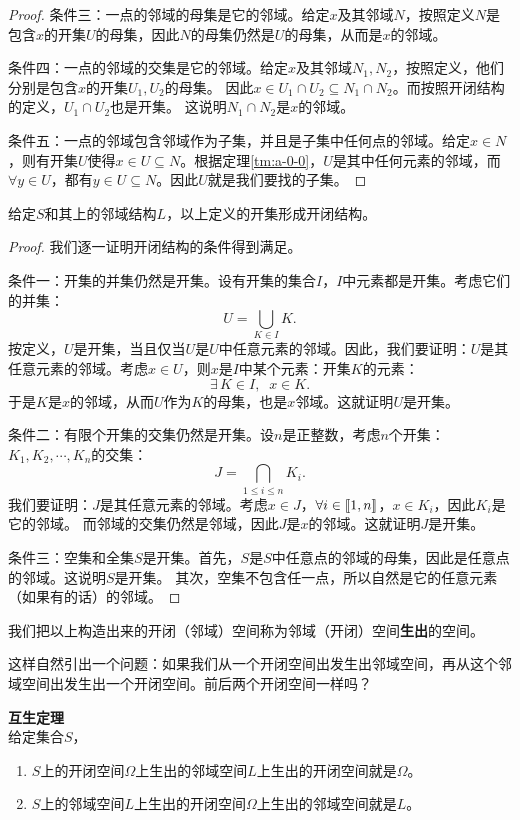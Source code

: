 \documentclass[12pt,UTF8]{ctexbook}
\begin{document}
\begin{appendix}
\begin{proof}
    条件三：一点的邻域的母集是它的邻域。给定$x$及其邻域$N$，按照定义$N$是包含$x$的开集$U$的母集，因此$N$的母集仍然是$U$的母集，从而是$x$的邻域。

    条件四：一点的邻域的交集是它的邻域。给定$x$及其邻域$N_1, N_2$，按照定义，他们分别是包含$x$的开集$U_1, U_2$的母集。
    因此$x\in U_1\cap U_2 \subseteq N_1\cap N_2 $。而按照开闭结构的定义，$U_1\cap  U_2$也是开集。
    这说明$N_1\cap N_2$是$x$的邻域。

    条件五：一点的邻域包含邻域作为子集，并且是子集中任何点的邻域。给定$x\in N$，则有开集$U$使得$x\in U \subseteq N$。根据定理\ref{tm:a-0-0}，$U$是其中任何元素的邻域，而$\forall y \in U$，都有$y\in U \subseteq N$。因此$U$就是我们要找的子集。
\end{proof}

\begin{tm}
    给定$S$和其上的邻域结构$L$，以上定义的开集形成开闭结构。
\end{tm}

\begin{proof}
    我们逐一证明开闭结构的条件得到满足。

    条件一：开集的并集仍然是开集。设有开集的集合$I$，$I$中元素都是开集。考虑它们的并集：
    $$ U = \bigcup_{K\in I} K. $$
    按定义，$U$是开集，当且仅当$U$是$U$中任意元素的邻域。因此，我们要证明：$U$是其任意元素的邻域。考虑$x\in U$，则$x$是$I$中某个元素：开集$K$的元素：
    $$ \exists \, K \in I, \;\; x \in K.$$
    于是$K$是$x$的邻域，从而$U$作为$K$的母集，也是$x$邻域。这就证明$U$是开集。

    条件二：有限个开集的交集仍然是开集。设$n$是正整数，考虑$n$个开集：$K_1, K_2, \cdots, K_n$的交集：
    $$ J = \bigcap_{1\leqslant i \leqslant n} K_i.$$
    我们要证明：$J$是其任意元素的邻域。考虑$x\in J$，$\forall i\in[\![1,n]\!]$，$x\in K_i$，因此$K_i$是它的邻域。
    而邻域的交集仍然是邻域，因此$J$是$x$的邻域。这就证明$J$是开集。

    条件三：空集和全集$S$是开集。首先，$S$是$S$中任意点的邻域的母集，因此是任意点的邻域。这说明$S$是开集。
    其次，空集不包含任一点，所以自然是它的任意元素（如果有的话）的邻域。

\end{proof}

我们把以上构造出来的开闭（邻域）空间称为邻域（开闭）空间\textbf{生出}的空间。

这样自然引出一个问题：如果我们从一个开闭空间出发生出邻域空间，再从这个邻域空间出发生出一个开闭空间。前后两个开闭空间一样吗？

\begin{tm}{\textbf{互生定理}}
    \mbox{} \\
    给定集合$S$，
    \begin{enumerate}
        \item $S$上的开闭空间$\Omega$上生出的邻域空间$L$上生出的开闭空间就是$\Omega$。
        \item $S$上的邻域空间$L$上生出的开闭空间$\Omega$上生出的邻域空间就是$L$。
    \end{enumerate}
\end{tm}


\end{appendix}
\end{document}

